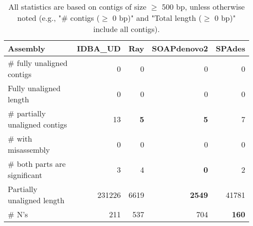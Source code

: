 \documentclass[12pt,a4paper]{article}
\begin{document}
\begin{table}[ht]
\begin{center}
\caption{All statistics are based on contigs of size $\geq$ 500 bp, unless otherwise noted (e.g., "\# contigs ($\geq$ 0 bp)" and "Total length ($\geq$ 0 bp)" include all contigs).}
\begin{tabular}{|l*{4}{|r}|}
\hline
Assembly & IDBA\_UD & Ray & SOAPdenovo2 & SPAdes \\ \hline
\# fully unaligned contigs & 0 & 0 & 0 & 0 \\ \hline
Fully unaligned length & 0 & 0 & 0 & 0 \\ \hline
\# partially unaligned contigs & 13 & {\bf 5} & {\bf 5} & 7 \\ \hline
\hspace{5mm}\# with misassembly & 0 & 0 & 0 & 0 \\ \hline
\hspace{5mm}\# both parts are significant & 3 & 4 & {\bf 0} & 2 \\ \hline
Partially unaligned length & 231226 & 6619 & {\bf 2549} & 41781 \\ \hline
\# N's & 211 & 537 & 704 & {\bf 160} \\ \hline
\end{tabular}
\end{center}
\end{table}
\end{document}
